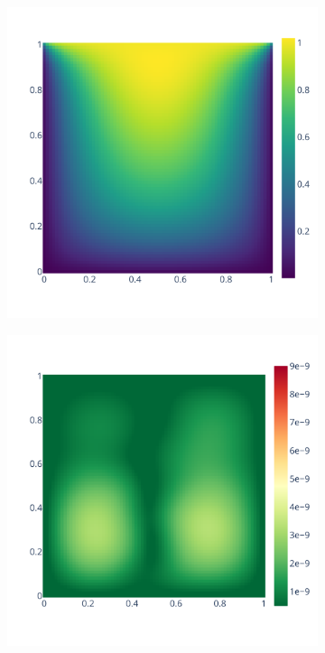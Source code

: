 \documentclass[11pt]{article}
\begin{document}
\begin{figure}
    \centering
    \begin{subfigure}{0.45\linewidth}
    \includegraphics[width=\linewidth]{figure/root_finding/solution_mean_RR.pdf}
    \caption{}
    \label{fig:my_label}
    \end{subfigure}
    \begin{subfigure}{0.45\linewidth}
    \includegraphics[width=\linewidth]{figure/root_finding/solution_std_RR.pdf}
    \caption{}
    \label{fig:my_label}
    \end{subfigure}
    

\end{figure}
\end{document}
